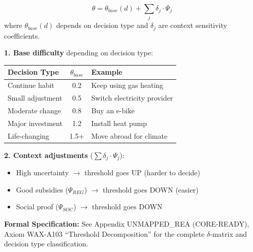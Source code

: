 \begin{definition}
\begin{equation}
\theta = \theta_{base}(d) + \sum_j \delta_j \cdot \Psi_j
\label{eq:theta-decomposition}
\end{equation}
where $\theta_{base}(d)$ depends on decision type and $\delta_j$ are context
sensitivity coefficients.
\end{definition}

\begin{intuition}

\textbf{1. Base difficulty} depending on decision type:

\begin{center}
\begin{tabular}{lcp{5cm}}
\toprule
\textbf{Decision Type} & $\theta_{base}$ & \textbf{Example}\\
\midrule
Continue habit & 0.2 & Keep using gas heating\\
Small adjustment & 0.5 & Switch electricity provider\\
Moderate change & 0.8 & Buy an e-bike\\
Major investment & 1.2 & Install heat pump\\
Life-changing & 1.5+ & Move abroad for climate\\
\bottomrule
\end{tabular}
\end{center}

\textbf{2. Context adjustments} ($\sum \delta_j \cdot \Psi_j$):
\begin{itemize}[nosep]
\item High uncertainty $\rightarrow$ threshold goes UP (harder to decide)
\item Good subsidies ($\Psi_{REG}$) $\rightarrow$ threshold goes DOWN (easier)
\item Social proof ($\Psi_{SOC}$) $\rightarrow$ threshold goes DOWN
\end{itemize}
\end{intuition}

\begin{cross-reference}
\textbf{Formal Specification:} See Appendix UNMAPPED_REA (CORE-READY), Axiom WAX-A103
``Threshold Decomposition'' for the complete $\delta$-matrix and decision type classification.
\end{cross-reference}



